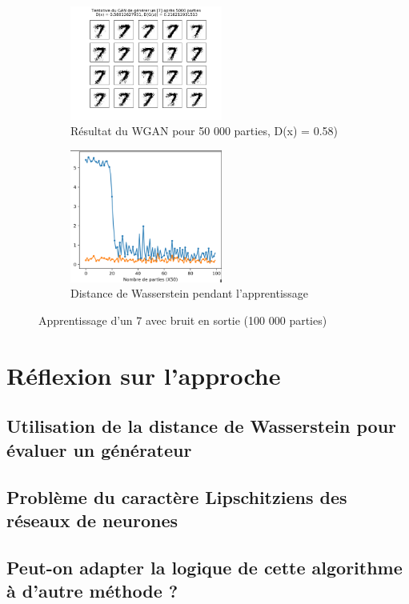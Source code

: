 \begin{figure}[ht!]
  \centering
  	\begin{subfigure}[b]{.4\linewidth}
    \includegraphics[width=5cm]{fig/Wgan_result_2}
    \caption{Résultat du WGAN pour 50 000 parties, D(x) = 0.58)}
    \label{fig:Wgan_result_2_nombres}
\end{subfigure}
\quad
\begin{subfigure}[b]{.4\linewidth}
  \centering
    \includegraphics[width=5cm]{fig/Wgan_result_2_courbe}
    \caption{Distance de Wasserstein pendant l'apprentissage}
    \label{fig:Wgan_result_2_courbe}
    \end{subfigure}
    \caption{Apprentissage d'un 7 avec bruit en sortie (100 000 parties)}
    \label{fig:Wgan_result_2}
\end{figure}
 \section{Réflexion sur l'approche}




 \subsection{Utilisation de la distance de Wasserstein pour évaluer un générateur}
 \subsection{Problème du caractère Lipschitziens des réseaux de neurones}
 \subsection{Peut-on adapter la logique de cette algorithme à d'autre méthode ?}